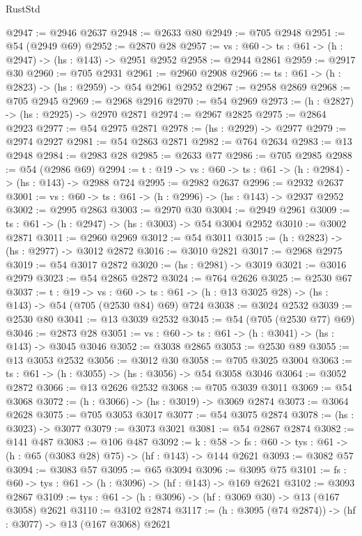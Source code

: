 \begin{lexlean}{RustStd}
\begin{coremodule}
@2947 := @2946 @2637
@2948 := @2633 @80
@2949 := @705 @2948
@2951 := @54 (@2949 @69)
@2952 := @2870 @28
@2957 := {vs : @60} -> {ts : @61} -> (h : @2947) -> (hs : @143) -> @2951 @2952
@2958 := @2944 @2861
@2959 := @2917 @30
@2960 := @705 @2931
@2961 := @2960 @2908
@2966 := {ts : @61} -> (h : @2823) -> (hs : @2959) -> @54 @2961 @2952
@2967 := @2958 @2869
@2968 := @705 @2945
@2969 := @2968 @2916
@2970 := @54 @2969
@2973 := (h : @2827) -> (hs : @2925) -> @2970 @2871
@2974 := @2967 @2825
@2975 := @2864 @2923
@2977 := @54 @2975 @2871
@2978 := (hs : @2929) -> @2977
@2979 := @2974 @2927
@2981 := @54 @2863 @2871
@2982 := @764 @2634
@2983 := @13 @2948
@2984 := @2983 @28
@2985 := @2633 @77
@2986 := @705 @2985
@2988 := @54 (@2986 @69)
@2994 := {t : @19} -> {vs : @60} -> {ts : @61} -> (h : @2984) -> (hs : @143) -> @2988 @724
@2995 := @2982 @2637
@2996 := @2932 @2637
@3001 := {vs : @60} -> {ts : @61} -> (h : @2996) -> (hs : @143) -> @2937 @2952
@3002 := @2995 @2863
@3003 := @2970 @30
@3004 := @2949 @2961
@3009 := {ts : @61} -> (h : @2947) -> (hs : @3003) -> @54 @3004 @2952
@3010 := @3002 @2871
@3011 := @2960 @2969
@3012 := @54 @3011
@3015 := (h : @2823) -> (hs : @2977) -> @3012 @2872
@3016 := @3010 @2821
@3017 := @2968 @2975
@3019 := @54 @3017 @2872
@3020 := (hs : @2981) -> @3019
@3021 := @3016 @2979
@3023 := @54 @2865 @2872
@3024 := @764 @2626
@3025 := @2530 @67
@3037 := {t : @19} ->
  {vs : @60} -> {ts : @61} -> (h : @13 @3025 @28) -> (hs : @143) -> @54 (@705 (@2530 @84) @69) @724
@3038 := @3024 @2532
@3039 := @2530 @80
@3041 := @13 @3039 @2532
@3045 := @54 (@705 (@2530 @77) @69)
@3046 := @2873 @28
@3051 := {vs : @60} -> {ts : @61} -> (h : @3041) -> (hs : @143) -> @3045 @3046
@3052 := @3038 @2865
@3053 := @2530 @89
@3055 := @13 @3053 @2532
@3056 := @3012 @30
@3058 := @705 @3025 @3004
@3063 := {ts : @61} -> (h : @3055) -> (hs : @3056) -> @54 @3058 @3046
@3064 := @3052 @2872
@3066 := @13 @2626 @2532
@3068 := @705 @3039 @3011
@3069 := @54 @3068
@3072 := (h : @3066) -> (hs : @3019) -> @3069 @2874
@3073 := @3064 @2628
@3075 := @705 @3053 @3017
@3077 := @54 @3075 @2874
@3078 := (hs : @3023) -> @3077
@3079 := @3073 @3021
@3081 := @54 @2867 @2874
@3082 := @141 @487
@3083 := @106 @487
@3092 := {k : @58} ->
  {fs : @60} -> {tys : @61} -> (h : @65 (@3083 @28) @75) -> (hf : @143) -> @144 @2621
@3093 := @3082 @57
@3094 := @3083 @57
@3095 := @65 @3094
@3096 := @3095 @75
@3101 := {fs : @60} -> {tys : @61} -> (h : @3096) -> (hf : @143) -> @169 @2621
@3102 := @3093 @2867
@3109 := {tys : @61} -> (h : @3096) -> (hf : @3069 @30) -> @13 (@167 @3058) @2621
@3110 := @3102 @2874
@3117 := (h : @3095 (@74 @2874)) -> (hf : @3077) -> @13 (@167 @3068) @2621

\end{coremodule}
\end{lexlean}
